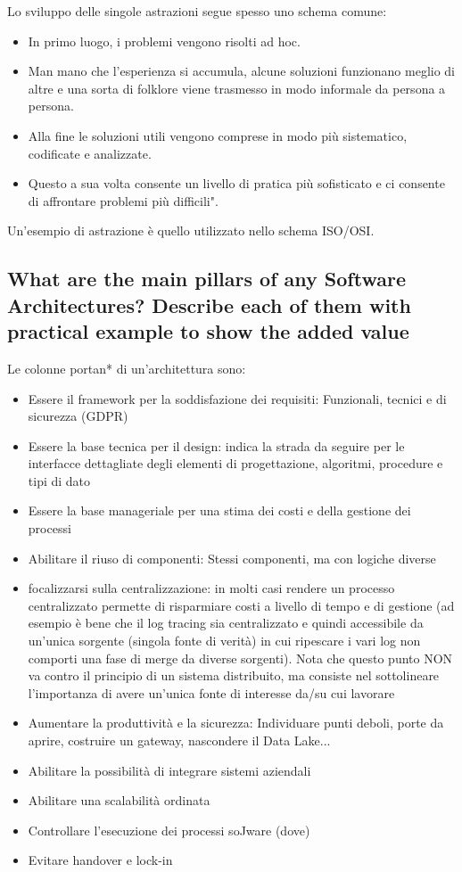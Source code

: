 \documentclass{article}
\begin{document}
Lo sviluppo delle singole astrazioni segue spesso uno schema comune:
\begin{itemize}
    \item In primo luogo, i problemi vengono risolti ad hoc.
    \item Man mano che l'esperienza si accumula, alcune soluzioni funzionano meglio di altre e una sorta di folklore viene trasmesso in modo informale da persona a persona.
    \item Alla fine le soluzioni utili vengono comprese in modo più sistematico, codificate e analizzate.
    \item Questo a sua volta consente un livello di pratica più sofisticato e ci consente di affrontare problemi più difficili".
\end{itemize}
Un'esempio di astrazione è quello utilizzato nello schema ISO/OSI.
\subsection{What are the main pillars of any Software Architectures? Describe each of them with practical example to show the added value}
Le colonne portan* di un’architettura sono:
\begin{itemize}
    \item Essere il framework per la soddisfazione dei requisiti: Funzionali, tecnici e di sicurezza (GDPR)
    \item Essere la base tecnica per il design: indica la strada da seguire per le interfacce dettagliate degli elementi di progettazione, algoritmi, procedure e tipi di dato
    \item Essere la base manageriale per una stima dei costi e della gestione dei processi
    \item Abilitare il riuso di componenti: Stessi componenti, ma con logiche diverse
    \item focalizzarsi sulla centralizzazione: in molti casi rendere un processo centralizzato permette di risparmiare costi a livello di tempo e di gestione (ad esempio è bene che il log tracing sia centralizzato e quindi accessibile da un'unica sorgente (singola fonte di verità) in cui ripescare i vari log non comporti una fase di merge da diverse sorgenti). Nota che questo punto NON va contro il principio di un sistema distribuito, ma consiste nel sottolineare l'importanza di avere un'unica fonte di interesse da/su cui lavorare
    \item Aumentare la produttività e la sicurezza: Individuare punti deboli, porte da aprire, costruire un gateway, nascondere il Data Lake...
    \item Abilitare la possibilità di integrare sistemi aziendali
    \item Abilitare una scalabilità ordinata
    \item Controllare l’esecuzione dei processi soJware (dove)
    \item Evitare handover e lock-in
\end{itemize}
\end{document}
